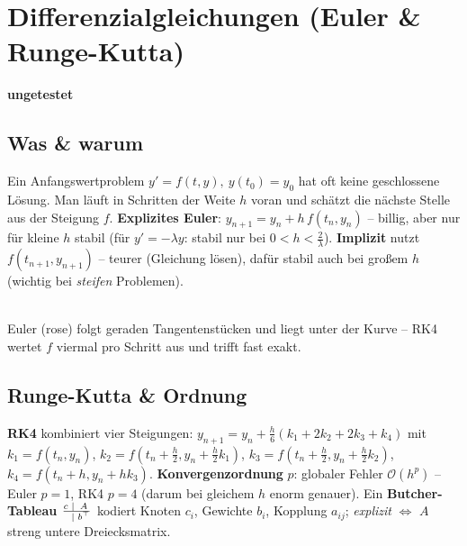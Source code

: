 \documentclass[a4paper,11pt]{article}
\newcommand{\chip}[2]{{\setlength{\fboxsep}{2.5pt}\colorbox{#1}{\color{bgdark}\footnotesize\bfseries #2}}}
\newcommand{\offen}{\chip{muted}{ungetestet}}
\begin{document}
\section{Differenzialgleichungen (Euler \& Runge-Kutta)}
\offen

\subsection{Was \& warum}
Ein Anfangswertproblem $y'=f(t,y),\ y(t_0)=y_0$ hat oft keine geschlossene Lösung. Man läuft in
Schritten der Weite $h$ voran und schätzt die nächste Stelle aus der Steigung $f$.
\textbf{Explizites Euler}: $y_{n+1}=y_n+h\,f(t_n,y_n)$ -- billig, aber nur für kleine $h$ stabil
(für $y'=-\lambda y$: stabil nur bei $0<h<\tfrac2\lambda$). \textbf{Implizit} nutzt $f(t_{n+1},y_{n+1})$
-- teurer (Gleichung lösen), dafür stabil auch bei großem $h$ (wichtig bei \emph{steifen} Problemen).

\begin{center}
\\[-2pt]
{\footnotesize\color{muted}Euler (rose) folgt geraden Tangentenstücken und liegt unter der Kurve -- RK4 wertet $f$ viermal pro Schritt aus und trifft fast exakt.}
\end{center}

\subsection{Runge-Kutta \& Ordnung}
\textbf{RK4} kombiniert vier Steigungen: $y_{n+1}=y_n+\frac h6(k_1+2k_2+2k_3+k_4)$ mit
$k_1=f(t_n,y_n)$, $k_2=f(t_n{+}\tfrac h2,y_n{+}\tfrac h2k_1)$, $k_3=f(t_n{+}\tfrac h2,y_n{+}\tfrac
h2k_2)$, $k_4=f(t_n{+}h,y_n{+}hk_3)$. \textbf{Konvergenzordnung} $p$: globaler Fehler $\mathcal O(h^p)$
-- Euler $p{=}1$, RK4 $p{=}4$ (darum bei gleichem $h$ enorm genauer). Ein \textbf{Butcher-Tableau}
$\begin{smallmatrix}c&|&A\\\hline&|&b^{\top}\end{smallmatrix}$ kodiert Knoten $c_i$, Gewichte $b_i$,
Kopplung $a_{ij}$; \emph{explizit} $\Leftrightarrow$ $A$ streng untere Dreiecksmatrix.
\end{document}
